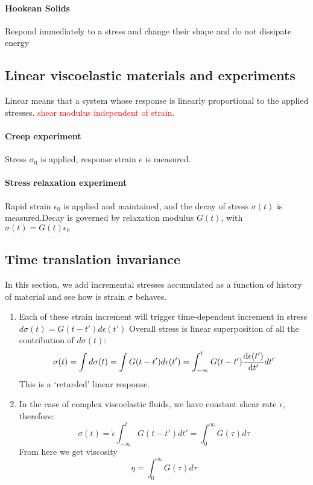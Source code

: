 \documentclass[12pt,a4paper]{article}
\begin{document}
    \paragraph*{Hookean Solids}
        Respond immediately to a stress and change their shape and do not dissipate energy
\subsection{Linear viscoelastic materials and experiments}
    Linear means that a system whose response is linearly proportional to the applied stresses. \textcolor{red}{shear modulus independent of strain.}
    \paragraph*{Creep experiment}
    Stress $\sigma_0$ is applied, response strain $\epsilon$ is measured.
    \paragraph*{Stress relaxation experiment}
    Rapid strain $\epsilon_0$ is applied and maintained, and the decay of stress $\sigma(t)$ is measured.Decay is governed by relaxation modulus $G(t)$, with $\sigma(t) = G(t)\epsilon_0$
\subsection {Time translation invariance}
    In this section, we add incremental stresses accumulated as a function of history of material and see how is strain $\sigma$ behaves.
    \begin{enumerate}
        \item Each of these strain increment will trigger time-dependent increment in stress $d\sigma(t) = G(t-t')d\epsilon(t')$
        Overall stress is linear superposition of all the contribution of $d\sigma(t)$:
        \begin{equation}
            \sigma(t)=\int d\sigma(t) = \int G(t-t')d\epsilon(t') =\int^{t}_{-\infty } G(t-t')\dv{\epsilon(t')}{t'} dt' 
        \end{equation}
        This is a `retarded' linear response.
        \item In the case of complex viscoelastic fluids, we have constant shear rate $\dot{\epsilon}$, therefore:
        \begin{equation}
            \sigma(t) = \dot{\epsilon}\int^{t}_{-\infty}G(t-t')dt'= \int^{\infty}_{0}G(\tau)d\tau
        \end{equation}
        From here we get viscosity
        \begin{equation}
            \eta =\int^{\infty}_{0}G(\tau)d\tau
        \end{equation}
    \end{enumerate}
\end{document}
